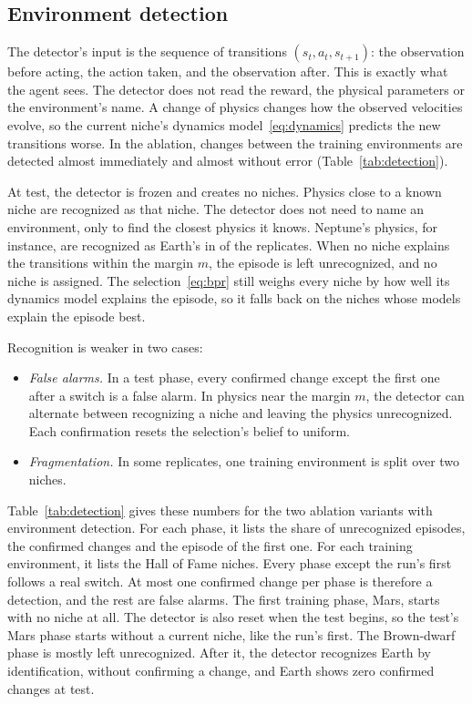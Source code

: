 \subsection{Environment detection}
\label{sec:appendix_detection}
The detector's input is the sequence of transitions $(s_t, a_t, s_{t+1})$: the observation before acting, the action taken, and the observation after. This is exactly what the agent sees. The detector does not read the reward, the physical parameters or the environment's name. A change of physics changes how the observed velocities evolve, so the current niche's dynamics model~\eqref{eq:dynamics} predicts the new transitions worse. In the ablation, changes between the training environments are detected almost immediately and almost without error (Table~\ref{tab:detection}).

At test, the detector is frozen and creates no niches. Physics close to a known niche are recognized as that niche. The detector does not need to name an environment, only to find the closest physics it knows. Neptune's physics, for instance, are recognized as Earth's in  of the  replicates. When no niche explains the transitions within the margin $m$, the episode is left unrecognized, and no niche is assigned. The selection~\eqref{eq:bpr} still weighs every niche by how well its dynamics model explains the episode, so it falls back on the niches whose models explain the episode best.

Recognition is weaker in two cases:
\begin{itemize}
\item \textit{False alarms.} In a test phase, every confirmed change except the first one after a switch is a false alarm. In physics near the margin $m$, the detector can alternate between recognizing a niche and leaving the physics unrecognized. Each confirmation resets the selection's belief to uniform.
\item \textit{Fragmentation.} In some replicates, one training environment is split over two niches.
\end{itemize}
Table~\ref{tab:detection} gives these numbers for the two ablation variants with environment detection. For each phase, it lists the share of unrecognized episodes, the confirmed changes and the episode of the first one. For each training environment, it lists the Hall of Fame niches. Every phase except the run's first follows a real switch. At most one confirmed change per phase is therefore a detection, and the rest are false alarms. The first training phase, Mars, starts with no niche at all. The detector is also reset when the test begins, so the test's Mars phase starts without a current niche, like the run's first. The Brown-dwarf phase is mostly left unrecognized. After it, the detector recognizes Earth by identification, without confirming a change, and Earth shows zero confirmed changes at test.

